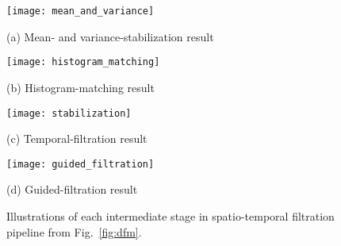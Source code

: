 \begin{figure}[!h]
	\begin{minipage}[b]{0.49\linewidth}
		\centering
		\centerline{ \texttt{[image: mean\_and\_variance]} }
		\centerline{\scriptsize{(a) Mean- and variance-stabilization result}}\medskip
	\end{minipage}%
	\hfill
	\begin{minipage}[b]{0.49\linewidth}
		\centering
		\centerline{\texttt{[image: histogram\_matching]} }
		\centerline{\scriptsize{(b) Histogram-matching result}}\medskip
	\end{minipage}
	\hfill
	\begin{minipage}[b]{0.49\linewidth}
		\centering
		\centerline{ \texttt{[image: stabilization]} }
		\centerline{\scriptsize{(c) Temporal-filtration result}}\medskip
	\end{minipage}%
	\hfill
	\begin{minipage}[b]{0.49\linewidth}
		\centering
		\centerline{\texttt{[image: guided\_filtration]} }
		\centerline{\scriptsize{(d) Guided-filtration result}}\medskip
	\end{minipage}
	\begin{minipage}[b]{\linewidth}
    \caption{Illustrations of each intermediate stage in spatio-temporal filtration
        pipeline from Fig.~\ref{fig:dfm}.}
    \label{fig:filtered}
    \end{minipage}
\end{figure}
